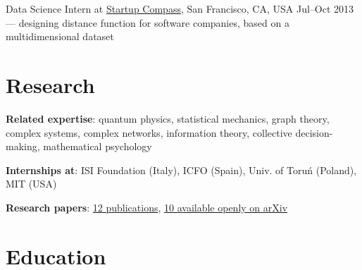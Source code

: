\documentclass[margin,line]{resume}
\begin{document}
\begin{resume}
\begin{list2}
    \item Data Science Intern at \href{http://compass.co}{Startup Compass}, San Francisco, CA, USA \hfill Jul--Oct 2013\\
        --- designing distance function for software companies, based on a multidimensional dataset


    \end{list2}

    \section{\mysidestyle Research}

    \begin{list2}

    \item {\bf Related expertise}: quantum physics, statistical mechanics, graph theory, complex systems, complex networks, information theory, collective decision-making, mathematical psychology

    \item {\bf Internships at}: ISI Foundation (Italy), ICFO (Spain), Univ. of Toruń (Poland), MIT (USA)

    \item {\bf Research papers}: \href{http://scholar.google.com/citations?user=JUwBsPAAAAAJ&hl=en}{12 publications}, \href{http://arxiv.org/a/migdal\_p\_1}{10 available openly on arXiv}

    \end{list2}


    \section{\mysidestyle Education}


\end{resume}
\end{document}
